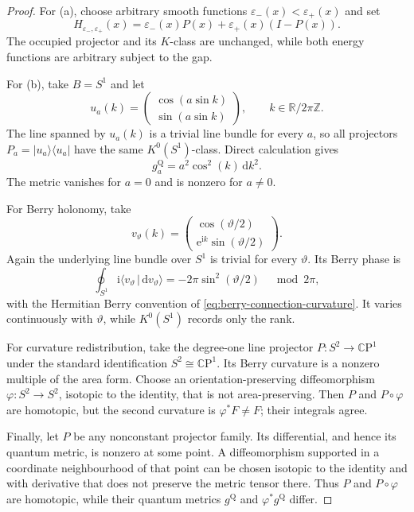 \documentclass[11pt]{article}
\theoremstyle{definition}
\theoremstyle{remark}
\newcommand{\CC}{\mathbb C}
\newcommand{\RR}{\mathbb R}
\newcommand{\ZZ}{\mathbb Z}
\newcommand{\dd}{\mathrm d}
\newcommand{\ii}{\mathrm i}
\newcommand{\e}{\mathrm e}
\newcommand{\eps}{\varepsilon}
\newcommand{\ket}[1]{\lvert #1\rangle}
\newcommand{\bra}[1]{\langle #1\rvert}
\newcommand{\braket}[2]{\langle #1\,|\,#2\rangle}
\begin{document}
\begin{proof}
For (a), choose arbitrary smooth functions
\(\eps_-(x)<\eps_+(x)\) and set
\[
             H_{\eps_-,\eps_+}(x)
               =\eps_-(x)P(x)+\eps_+(x)(I-P(x)).
               \tag{7.6}\label{eq:fixed-projector-H}
\]
The occupied projector and its \(K\)-class are unchanged, while both energy
functions are arbitrary subject to the gap.

For (b), take \(B=S^1\) and let
\[
 u_a(k)=
 \begin{pmatrix}
   \cos(a\sin k)\\
   \sin(a\sin k)
 \end{pmatrix},
 \qquad k\in\RR/2\pi\ZZ .
 \tag{7.7}\label{eq:metric-circle-family}
\]
The line spanned by \(u_a(k)\) is a trivial line bundle for every \(a\), so
all projectors \(P_a=\ket{u_a}\bra{u_a}\) have the same \(K^0(S^1)\)-class.
Direct calculation gives
\[
                 g_a^{\mathrm Q}=a^2\cos^2(k)\,\dd k^2.
                 \tag{7.8}\label{eq:circle-metric}
\]
The metric vanishes for \(a=0\) and is nonzero for \(a\neq0\).

For Berry holonomy, take
\[
 v_\vartheta(k)=
 \begin{pmatrix}
  \cos(\vartheta/2)\\
  \e^{\ii k}\sin(\vartheta/2)
 \end{pmatrix}.
 \tag{7.9}\label{eq:berry-circle-family}
\]
Again the underlying line bundle over \(S^1\) is trivial for every
\(\vartheta\).  Its Berry phase is
\[
 \oint_{S^1}\ii\braket{v_\vartheta}{\dd v_\vartheta}
       =-2\pi\sin^2(\vartheta/2)
       \quad \bmod 2\pi,
 \tag{7.10}\label{eq:berry-circle}
\]
with the Hermitian Berry convention of
\eqref{eq:berry-connection-curvature}.  It varies continuously with
\(\vartheta\), while \(K^0(S^1)\) records only the rank.

For curvature redistribution, take the degree-one line projector
\(P:S^2\to\CC\mathrm P^1\) under the standard identification
\(S^2\cong\CC\mathrm P^1\).  Its Berry curvature is a nonzero multiple of
the area form.  Choose an orientation-preserving diffeomorphism
\(\varphi:S^2\to S^2\), isotopic to the identity, that is not
area-preserving.  Then \(P\) and \(P\circ\varphi\) are homotopic, but the
second curvature is \(\varphi^*F\neq F\); their integrals agree.

Finally, let \(P\) be any nonconstant projector family.  Its differential,
and hence its quantum metric, is nonzero at some point.  A diffeomorphism
supported in a coordinate neighbourhood of that point can be chosen
isotopic to the identity and with derivative that does not preserve the
metric tensor there.  Thus \(P\) and \(P\circ\varphi\) are homotopic, while
their quantum metrics \(g^{\mathrm Q}\) and
\(\varphi^*g^{\mathrm Q}\) differ.
\end{proof}
\end{document}
